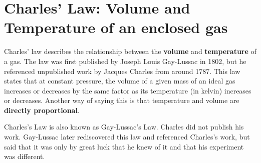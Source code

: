 



\section{Charles' Law: Volume and Temperature of an enclosed gas}

Charles' law describes the relationship between the \textbf{volume} and \textbf{temperature} of a gas. The law was first published by Joseph Louis Gay-Lussac in 1802, but he referenced unpublished work by Jacques Charles from around 1787. This law states that at constant pressure, the volume of a given mass of an ideal gas increases or decreases by the same factor as its temperature (in kelvin) increases or decreases. Another way of saying this is that temperature and volume are \textbf{directly proportional}.%



\begin{IFact}{Charles's Law is also known as Gay-Lussac's Law. Charles did not publish his work. Gay-Lussac later rediscovered this law and referenced Charles's work, but said that it was only by great luck that he knew of it and that his experiment was different.}
\end{IFact}

